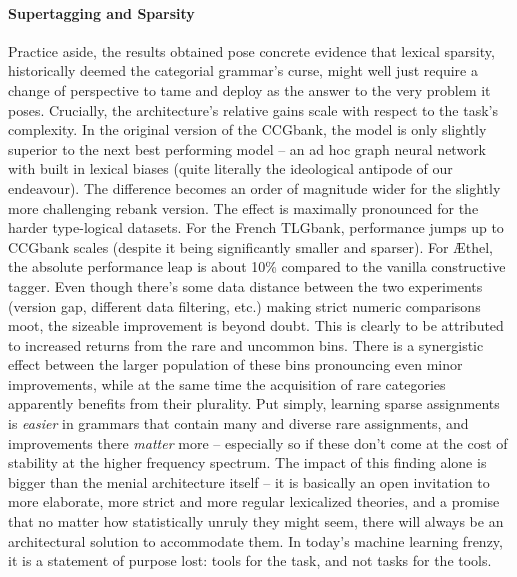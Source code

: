 \paragraph{Supertagging and Sparsity}
Practice aside, the results obtained pose concrete evidence that lexical sparsity, historically deemed the categorial grammar's curse, might well just require a change of perspective to tame and deploy as the answer to the very problem it poses.
Crucially, the architecture's relative gains scale with respect to the task's complexity.
In the original version of the CCGbank, the model is only slightly superior to the next best performing model -- an ad hoc graph neural network with built in lexical biases (quite literally the ideological antipode of our endeavour).
The difference becomes an order of magnitude wider for the slightly more challenging rebank version.
The effect is maximally pronounced for the harder type-logical datasets.
For the French TLGbank, performance jumps up to CCGbank scales (despite it being significantly smaller and sparser).
For \AE thel, the absolute performance leap is about 10\% compared to the vanilla constructive tagger.
Even though there's some data distance between the two experiments (version gap, different data filtering, etc.) making strict numeric comparisons moot, the sizeable improvement is beyond doubt.
This is clearly to be attributed to increased returns from the rare and uncommon bins.
There is a synergistic effect between the larger population of these bins pronouncing even minor improvements, while at the same time the acquisition of rare categories apparently benefits from their plurality.
Put simply, learning sparse assignments is \textit{easier} in grammars that contain many and diverse rare assignments, and improvements there \textit{matter} more -- especially so if these don't come at the cost of stability at the higher frequency spectrum.
The impact of this finding alone is bigger than the menial architecture itself -- it is basically an open invitation to more elaborate, more strict and more regular lexicalized theories, and a promise that no matter how statistically unruly they might seem, there will always be an architectural solution to accommodate them.
In today's machine learning frenzy, it is a statement of purpose lost: tools for the task, and not tasks for the tools.

